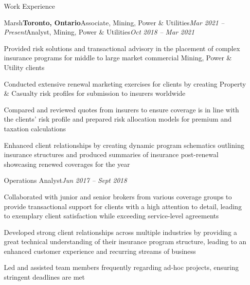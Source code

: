 \documentclass{resume} %
\begin{document}
\begin{rSection}{Work Experience}

\begin{mSubsection}{Marsh}{\bf Toronto, Ontario}{Associate, Mining, Power \& Utilities}{\emph {Mar 2021 -- Present}}{Analyst, Mining, Power \& Utilities}{\emph {Oct 2018 -- Mar 2021}}
\smallskip
\item Provided risk solutions and transactional advisory in the placement of complex insurance programs for middle to large market commercial Mining, Power \& Utility clients
\item Conducted extensive renewal marketing exercises for clients by creating Property \& Casualty risk profiles for submission to insurers worldwide 
\item Compared and reviewed quotes from insurers to ensure coverage is in line with the clients' risk profile and prepared risk allocation models for premium and taxation calculations
\item Enhanced client relationships by creating dynamic program schematics outlining insurance structures and produced summaries of insurance post-renewal showcasing renewed coverages for the year

\end{mSubsection}

\begin{pSubsection}{Operations Analyst}{\emph {Jun 2017 -- Sept 2018}}
\item Collaborated with junior and senior brokers from various coverage groups to provide transactional support for clients with a high attention to detail, leading to exemplary client satisfaction while exceeding service-level agreements
\item Developed strong client relationships across multiple industries by providing a great technical understanding of their insurance program structure, leading to an enhanced customer experience and recurring streams of business 
\item Led and assisted team members frequently regarding ad-hoc projects, ensuring stringent deadlines are met


\end{pSubsection}
\end{rSection}
\end{document}
